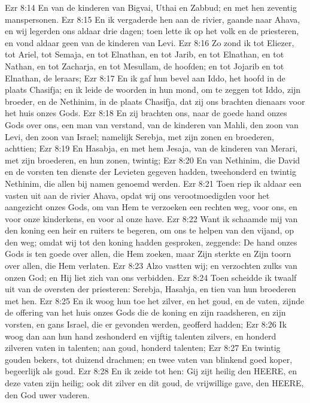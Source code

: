 Ezr 8:14  En van de kinderen van Bigvai, Uthai en Zabbud; en met hen zeventig manspersonen.
Ezr 8:15  En ik vergaderde hen aan de rivier, gaande naar Ahava, en wij legerden ons aldaar drie dagen; toen lette ik op het volk en de priesteren, en vond aldaar geen van de kinderen van Levi.
Ezr 8:16  Zo zond ik tot Eliezer, tot Ariel, tot Semaja, en tot Elnathan, en tot Jarib, en tot Elnathan, en tot Nathan, en tot Zacharja, en tot Mesullam, de hoofden; en tot Jojarib en tot Elnathan, de leraars;
Ezr 8:17  En ik gaf hun bevel aan Iddo, het hoofd in de plaats Chasifja; en ik leide de woorden in hun mond, om te zeggen tot Iddo, zijn broeder, en de Nethinim, in de plaats Chasifja, dat zij ons brachten dienaars voor het huis onzes Gods.
Ezr 8:18  En zij brachten ons, naar de goede hand onzes Gods over ons, een man van verstand, van de kinderen van Mahli, den zoon van Levi, den zoon van Israel; namelijk Serebja, met zijn zonen en broederen, achttien;
Ezr 8:19  En Hasabja, en met hem Jesaja, van de kinderen van Merari, met zijn broederen, en hun zonen, twintig;
Ezr 8:20  En van Nethinim, die David en de vorsten ten dienste der Levieten gegeven hadden, tweehonderd en twintig Nethinim, die allen bij namen genoemd werden.
Ezr 8:21  Toen riep ik aldaar een vasten uit aan de rivier Ahava, opdat wij ons verootmoedigden voor het aangezicht onzes Gods, om van Hem te verzoeken een rechten weg, voor ons, en voor onze kinderkens, en voor al onze have.
Ezr 8:22  Want ik schaamde mij van den koning een heir en ruiters te begeren, om ons te helpen van den vijand, op den weg; omdat wij tot den koning hadden gesproken, zeggende: De hand onzes Gods is ten goede over allen, die Hem zoeken, maar Zijn sterkte en Zijn toorn over allen, die Hem verlaten.
Ezr 8:23  Alzo vastten wij; en verzochten zulks van onzen God; en Hij liet zich van ons verbidden.
Ezr 8:24  Toen scheidde ik twaalf uit van de oversten der priesteren: Serebja, Hasabja, en tien van hun broederen met hen.
Ezr 8:25  En ik woog hun toe het zilver, en het goud, en de vaten, zijnde de offering van het huis onzes Gods die de koning en zijn raadsheren, en zijn vorsten, en gans Israel, die er gevonden werden, geofferd hadden;
Ezr 8:26  Ik woog dan aan hun hand zeshonderd en vijftig talenten zilvers, en honderd zilveren vaten in talenten; aan goud, honderd talenten;
Ezr 8:27  En twintig gouden bekers, tot duizend drachmen; en twee vaten van blinkend goed koper, begeerlijk als goud.
Ezr 8:28  En ik zeide tot hen: Gij zijt heilig den HEERE, en deze vaten zijn heilig; ook dit zilver en dit goud, de vrijwillige gave, den HEERE, den God uwer vaderen.
